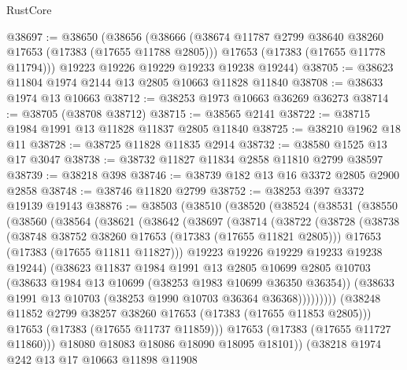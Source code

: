 \begin{lexlean}{RustCore}
\begin{coremodule}
@38697 := @38650
    (@38656
      (@38666
        (@38674 @11787 @2799 @38640 @38260 @17653 (@17383 (@17655 @11788 @2805)))
        @17653
        (@17383 (@17655 @11778 @11794)))
      @19223
      @19226
      @19229
      @19233
      @19238
      @19244)
@38705 := @38623 @11804 @1974 @2144 @13 @2805 @10663 @11828 @11840
@38708 := @38633 @1974 @13 @10663
@38712 := @38253 @1973 @10663 @36269 @36273
@38714 := @38705 (@38708 @38712)
@38715 := @38565 @2141
@38722 := @38715 @1984 @1991 @13 @11828 @11837 @2805 @11840
@38725 := @38210 @1962 @18 @11
@38728 := @38725 @11828 @11835 @2914
@38732 := @38580 @1525 @13 @17 @3047
@38738 := @38732 @11827 @11834 @2858 @11810 @2799 @38597
@38739 := @38218 @398
@38746 := @38739 @182 @13 @16 @3372 @2805 @2900 @2858
@38748 := @38746 @11820 @2799
@38752 := @38253 @397 @3372 @19139 @19143
@38876 := @38503
    (@38510
      (@38520
        (@38524
          (@38531
            (@38550
              (@38560
                (@38564
                  (@38621
                    (@38642
                      (@38697
                        (@38714
                          (@38722
                            (@38728
                              (@38738
                                (@38748 @38752 @38260 @17653 (@17383 (@17655 @11821 @2805)))
                                @17653
                                (@17383 (@17655 @11811 @11827)))
                              @19223
                              @19226
                              @19229
                              @19233
                              @19238
                              @19244)
                            (@38623
                              @11837
                              @1984
                              @1991
                              @13
                              @2805
                              @10699
                              @2805
                              @10703
                              (@38633 @1984 @13 @10699 (@38253 @1983 @10699 @36350 @36354))
                              (@38633 @1991 @13 @10703 (@38253 @1990 @10703 @36364 @36368)))))))))
                (@38248 @11852 @2799 @38257 @38260 @17653 (@17383 (@17655 @11853 @2805)))
                @17653
                (@17383 (@17655 @11737 @11859)))
              @17653
              (@17383 (@17655 @11727 @11860)))
            @18080
            @18083
            @18086
            @18090
            @18095
            @18101))
        (@38218
          @1974
          @242
          @13
          @17
          @10663
          @11898
          @11908

\end{coremodule}
\end{lexlean}
